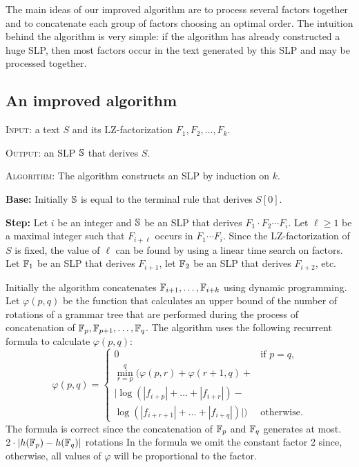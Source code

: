 ﻿\documentclass[10pt, conference, compsocconf]{IEEEtran}
\begin{document}
The main ideas of our improved  algorithm are to process several factors
together and to concatenate each group of factors choosing an optimal order.
The intuition behind the algorithm is very simple: if the algorithm has already
constructed a huge SLP, then most factors occur in the text generated by this
SLP and may be processed together.

\subsection{An improved algorithm}

\noindent \textsc{Input:} a text $S$ and its LZ-factorization $F_1, F_2, \dots,
F_k$.

\noindent \textsc{Output:} an SLP $\mathbb{S}$ that derives $S$.

\noindent \textsc{Algorithm:} The algorithm constructs an SLP by induction on
$k$.

\textbf{Base:} Initially $\mathbb{S}$ is equal to the terminal rule that derives
$S[0]$.

\textbf{Step:} Let $i$ be an integer and $\mathbb{S}$ be an SLP that derives
$F_1\cdot F_2 \cdots F_i$. Let $\ell \geq 1$ be a maximal integer such that
$F_{i+\ell}$ occurs in $F_1 \cdots F_i$. Since the LZ-factorization of $S$ is
fixed, the value of $\ell$ can be found by using a linear time search on
factors. Let $\mathbb{F}_1$ be an SLP that derives $F_{i+1}$, let $\mathbb{F}_2$ be
an SLP that derives $F_{i+2}$, etc.

Initially the algorithm concatenates $\mathbb{F}_{i+1}, \dots, \mathbb{F}_{i+k}$
using dynamic programming. Let $\varphi(p, q)$ be the function that calculates
an upper bound of the number of rotations of a grammar tree that are performed
during the process of concatenation of $\mathbb{F}_p, \mathbb{F}_{p+1}, \dots,
\mathbb{F}_q$. The algorithm uses the following recurrent formula to calculate
$\varphi(p,q)$:
$$\varphi(p, q) = \begin{cases}
0 &\text{if } p=q, \\
\min_{r = p}^q(\varphi(p, r) + \varphi(r+1, q) +&\\
|\log(|f_{i+p}|+\dots+|f_{i+r}|) -& \\
\log(|f_{i+r+1}|+\dots+|f_{i+q}|)|) &\mbox{otherwise}.
\end{cases}$$
The formula is correct since the concatenation of $\mathbb{F}_p$ and $\mathbb{F}_q$
generates at most. $2\cdot|h(\mathbb{F}_p) - h(\mathbb{F}_q)|$ rotations  In the
formula we omit the constant factor 2 since, otherwise, all values of $\varphi$
will be proportional to the factor.
\end{document}
